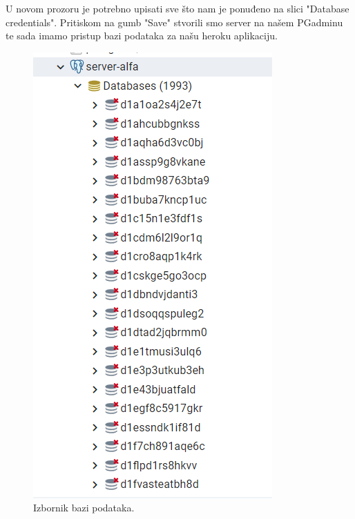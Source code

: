 			 U novom prozoru je potrebno upisati sve što nam je ponuđeno na slici  "Database credentials". Pritiskom na gumb "Save" stvorili smo server na našem PGadminu te sada imamo pristup bazi podataka za našu heroku aplikaciju.
			 \begin{figure}[H]
			 	\includegraphics[scale=0.5]{slike/Server-alfa.png} 
			 	\centering
			 	\caption{ Izbornik bazi podataka.}
			 	\label{DS}
			 \end{figure}
			 
